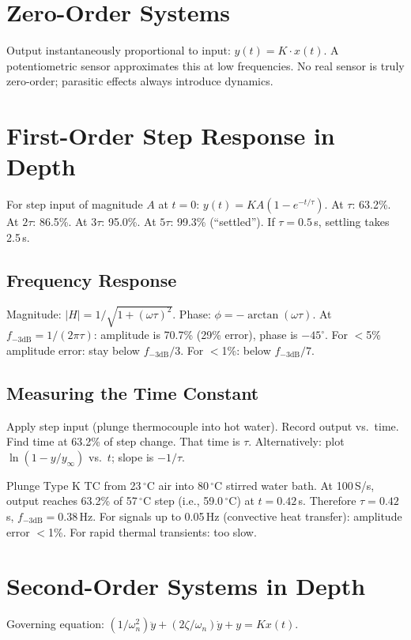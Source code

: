 \documentclass[11pt,letterpaper,twoside,openany]{book}
\newcommand{\degC}{\ensuremath{{}^{\circ}\text{C}}}
\begin{document}
\section{Zero-Order Systems}
Output instantaneously proportional to input: $y(t) = K \cdot x(t)$. A potentiometric sensor approximates this at low frequencies. No real sensor is truly zero-order; parasitic effects always introduce dynamics.

\section{First-Order Step Response in Depth}
For step input of magnitude $A$ at $t = 0$: $y(t) = KA(1 - e^{-t/\tau})$. At $\tau$: 63.2\%. At $2\tau$: 86.5\%. At $3\tau$: 95.0\%. At $5\tau$: 99.3\% (``settled''). If $\tau = 0.5$\,s, settling takes 2.5\,s.

\subsection{Frequency Response}
Magnitude: $|H| = 1/\sqrt{1+(\omega\tau)^2}$. Phase: $\phi = -\arctan(\omega\tau)$. At $f_{-3\text{dB}} = 1/(2\pi\tau)$: amplitude is 70.7\% (29\% error), phase is $-45^\circ$. For $<$5\% amplitude error: stay below $f_{-3\text{dB}}/3$. For $<$1\%: below $f_{-3\text{dB}}/7$.

\subsection{Measuring the Time Constant}
Apply step input (plunge thermocouple into hot water). Record output vs.\ time. Find time at 63.2\% of step change. That time is $\tau$. Alternatively: plot $\ln(1 - y/y_\infty)$ vs.\ $t$; slope is $-1/\tau$.

\begin{examplebox}
Plunge Type K TC from 23\,\degC{} air into 80\,\degC{} stirred water bath. At 100\,S/s, output reaches 63.2\% of 57\,\degC{} step (i.e., 59.0\,\degC{}) at $t = 0.42$\,s. Therefore $\tau = 0.42$\,s, $f_{-3\text{dB}} = 0.38$\,Hz. For signals up to 0.05\,Hz (convective heat transfer): amplitude error $<$1\%. For rapid thermal transients: too slow.
\end{examplebox}

\section{Second-Order Systems in Depth}
Governing equation: $(1/\omega_n^2)\ddot{y} + (2\zeta/\omega_n)\dot{y} + y = Kx(t)$.
\end{document}
